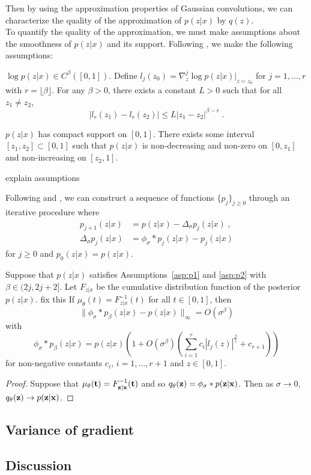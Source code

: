 \documentclass[10pt]{article}
\begin{document}
\todo Then by using the approximation properties of Gaussian convolutions, we can characterize the quality of the approximation of $p(z|x)$ by $q(z)$.
\\

To quantify the quality of the approximation, we must make assumptions about the smoothness of $p(z|x)$ and its support. Following \citet{Plummer:2021}, we make the following assumptions:

\begin{assumption} \label{asp:p1}
$\log p(z|x) \in C^\beta([0,1])$. Define $l_j(z_0) = \nabla_z^j\log p(z|x)\big|_{z=z_0}$ for $j=1,\ldots,r$ with $r=\lfloor\beta\rfloor$. For any $\beta>0$, there exists a constant $L>0$ such that for all $z_1\neq z_2$,
\[
|l_r(z_1)-l_r(z_2)| \leq L|z_1-z_2|^{\beta-r} \;.
\]
\end{assumption}

\begin{assumption} \label{asp:p2}
$p(z|x)$ has compact support on $[0,1]$. There exists some interval $[z_1,z_2]\subset[0,1]$ such that $p(z|x)$ is non-decreasing and non-zero on $[0,z_1]$ and non-increasing on $[z_2,1]$.
\end{assumption}

\todo explain assumptions

\todo Following \citet{Kruijer:2010} and \citet{Plummer:2021}, we can construct a sequence of functions $\{p_j\}_{j\geq0}$ through an iterative procedure where
\begin{align*}
p_{j+1}(z|x) &= p(z|x) - \Delta_\sigma p_j(z|x) \;, \\
\Delta_\sigma p_j(z|x) &= \phi_\sigma * p_j(z|x) - p_j(z|x)
\end{align*}
for $j\geq0$ and $p_0(z|x)=p(z|x)$.

\begin{proposition}
Suppose that $p(z|x)$ satisfies Assumptions~\ref{asp:p1} and \ref{asp:p2} with $\beta\in(2j,2j+2]$. Let $F_{z|x}$ be the cumulative distribution function of the posterior $p(z|x)$. \todo fix this If $\mu_\theta(t)=F_{z|x}^{-1}(t)$ for all $t\in[0,1]$, then
\[
\|\phi_\sigma * p_\beta(z|x) - p(z|x)\|_\infty = O(\sigma^\beta)
\]
with
\[
\phi_\sigma * p_\beta(z|x) = p(z|x)\left(1+O(\sigma^\beta)\left(\sum_{i=1}^rc_i|l_j(z)|^{\frac{\beta}{i}}+c_{r+1}\right)\right)
\]
for non-negative constants $c_i$, $i=1,\ldots,r+1$ and $z\in[0,1]$.
\end{proposition}
\begin{proof}
Suppose that $\mu_\theta(\mathbf{t})=F_{\mathbf{z}|\mathbf{x}}^{-1}(\mathbf{t})$ and so $q_\theta(\mathbf{z})=\phi_\sigma*p(\mathbf{z}|\mathbf{x})$. Then as $\sigma\rightarrow0$, $q_\theta(\mathbf{z})\rightarrow p(\mathbf{z}|\mathbf{x})$.
\end{proof}


\subsection{Variance of gradient}

\subsection{Discussion}


\newpage




\end{document}
